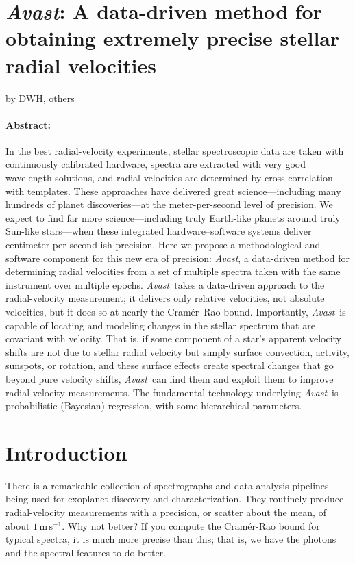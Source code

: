 \documentclass[12pt, letterpaper]{article}
\newcommand{\project}[1]{\textsl{#1}}
\newcommand{\Avast}{\project{Avast}}
\newcommand{\unit}[1]{\mathrm{#1}}
\newcommand{\m}{\unit{m}}
\newcommand{\s}{\unit{s}}
\newcommand{\mps}{\m\,\s^{-1}}
\begin{document}
\section*{\Avast: A data-driven method for obtaining extremely precise stellar radial velocities}

\noindent
by DWH, others

\paragraph{Abstract:}
In the best radial-velocity experiments, stellar
spectroscopic data are taken with continuously calibrated hardware,
spectra are extracted with very good wavelength solutions, and radial
velocities are determined by cross-correlation with templates.
These approaches have delivered great science---including many
hundreds of planet discoveries---at the meter-per-second level of
precision.
We expect to find far more science---including truly Earth-like
planets around truly Sun-like stars---when these integrated
hardware--software systems deliver centimeter-per-second-ish
precision.
Here we propose a methodological and software component for this new
era of precision: \Avast, a data-driven method for determining
radial velocities from a set of multiple spectra taken with the same
instrument over multiple epochs.
\Avast\ takes a data-driven approach to the radial-velocity
measurement; it delivers only relative velocities, not absolute
velocities, but it does so at nearly the Cram\'er--Rao bound.
Importantly, \Avast\ is capable of locating and modeling changes in
the stellar spectrum that are covariant with velocity.
That is, if some component of a star's apparent velocity shifts are
not due to stellar radial velocity but simply surface convection,
activity, sunspots, or rotation, and these surface effects create
spectral changes that go beyond pure velocity shifts, \Avast\ can find
them and exploit them to improve radial-velocity measurements.
The fundamental technology underlying \Avast\ is probabilistic
(Bayesian) regression, with some hierarchical parameters.

\section{Introduction}

There is a remarkable collection of spectrographs and data-analysis
pipelines being used for exoplanet discovery and characterization.
They routinely produce radial-velocity measurements with a precision,
or scatter about the mean, of about $1\,\mps$.
Why not better?
If you compute the Cram\'er-Rao bound for typical spectra, it is much
more precise than this; that is, we have the photons and the spectral
features to do better.
\end{document}

